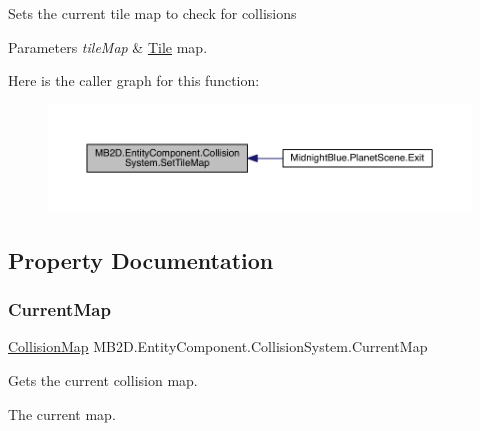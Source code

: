 Sets the current tile map to check for collisions 


\begin{DoxyParams}{Parameters}
{\em tile\+Map} & \hyperlink{class_m_b2_d_1_1_tile}{Tile} map.\\
\hline
\end{DoxyParams}
Here is the caller graph for this function\+:
\nopagebreak
\begin{figure}[H]
\begin{center}
\leavevmode
\includegraphics[width=350pt]{class_m_b2_d_1_1_entity_component_1_1_collision_system_a4710a6cf7aba7b5ba9c75e0771793b93_icgraph}
\end{center}
\end{figure}


\subsection{Property Documentation}
\hypertarget{class_m_b2_d_1_1_entity_component_1_1_collision_system_a338aebc3f288cf68926074026af3dbba}{}\label{class_m_b2_d_1_1_entity_component_1_1_collision_system_a338aebc3f288cf68926074026af3dbba} 
\subsubsection{\texorpdfstring{Current\+Map}{CurrentMap}}
{\footnotesize\ttfamily \hyperlink{class_m_b2_d_1_1_collision_1_1_collision_map}{Collision\+Map} M\+B2\+D.\+Entity\+Component.\+Collision\+System.\+Current\+Map\hspace{0.3cm}{\ttfamily [get]}}



Gets the current collision map. 

The current map.\hypertarget{class_m_b2_d_1_1_entity_component_1_1_collision_system_a9448df47918780c8287b6f7ff177d46f}{}\label{class_m_b2_d_1_1_entity_component_1_1_collision_system_a9448df47918780c8287b6f7ff177d46f} 
